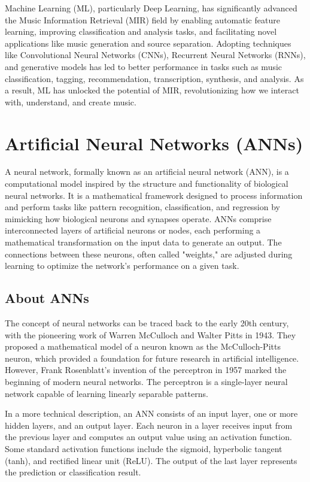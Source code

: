 Machine Learning (ML), particularly Deep Learning, has significantly advanced the Music Information Retrieval (MIR) field by enabling automatic feature learning, improving classification and analysis tasks, and facilitating novel applications like music generation and source separation. Adopting techniques like Convolutional Neural Networks (CNNs), Recurrent Neural Networks (RNNs), and generative models has led to better performance in tasks such as music classification, tagging, recommendation, transcription, synthesis, and analysis. As a result, ML has unlocked the potential of MIR, revolutionizing how we interact with, understand, and create music.

\section{Artificial Neural Networks (ANNs)}
A neural network, formally known as an artificial neural network (ANN), is a computational model inspired by the structure and functionality of biological neural networks. It is a mathematical framework designed to process information and perform tasks like pattern recognition, classification, and regression by mimicking how biological neurons and synapses operate. ANNs comprise interconnected layers of artificial neurons or nodes, each performing a mathematical transformation on the input data to generate an output. The connections between these neurons, often called "weights," are adjusted during learning to optimize the network's performance on a given task.

\subsection{About ANNs}
The concept of neural networks can be traced back to the early 20th century, with the pioneering work of Warren McCulloch and Walter Pitts in 1943. They proposed a mathematical model of a neuron known as the McCulloch-Pitts neuron, which provided a foundation for future research in artificial intelligence. However, Frank Rosenblatt's invention of the perceptron in 1957 marked the beginning of modern neural networks. The perceptron is a single-layer neural network capable of learning linearly separable patterns.

In a more technical description, an ANN consists of an input layer, one or more hidden layers, and an output layer. Each neuron in a layer receives input from the previous layer and computes an output value using an activation function. Some standard activation functions include the sigmoid, hyperbolic tangent (tanh), and rectified linear unit (ReLU). The output of the last layer represents the prediction or classification result.


